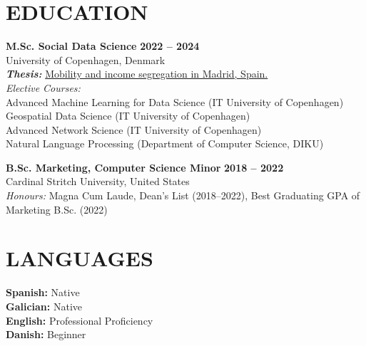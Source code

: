 \documentclass{resume}
\begin{document}
\section{EDUCATION} 
\begin{content}
    {\bf M.Sc. Social Data Science} \hfill {\bf 2022 -- 2024} \\
    University of Copenhagen, Denmark \\
    {\bf \em Thesis:} {\href{https://github.com/carobs9/segregation-madrid}{Mobility and income segregation in Madrid, Spain.}} \\ 
    {\em Elective Courses:} \\
    {\small
    Advanced Machine Learning for Data Science (IT University of Copenhagen) \\ 
    Geospatial Data Science (IT University of Copenhagen) \\
    Advanced Network Science (IT University of Copenhagen) \\
    Natural Language Processing (Department of Computer Science, DIKU) \\
    }


    {\bf B.Sc. Marketing, Computer Science Minor} \hfill {\bf 2018 -- 2022} \\
    Cardinal Stritch University, United States \\
    {\em Honours:} Magna Cum Laude, Dean's List (2018--2022), Best Graduating GPA of Marketing B.Sc. (2022)
\end{content}

\section{LANGUAGES} 
\begin{content}
    {\bf Spanish:} Native \\
    {\bf Galician:} Native \\
    {\bf English:} Professional Proficiency  \\
    {\bf Danish:} Beginner \\
\end{content}

\end{document}
